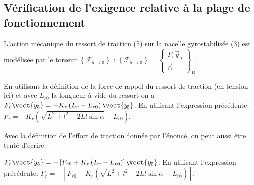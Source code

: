 \subsection*{Vérification de l'exigence relative à la plage de fonctionnement}
\ifprof
\else
L'action mécanique du ressort de traction (5) sur la nacelle gyrostabilisée (3) est modélisée par le torseur $\left\{\mathcal{F}_{5 \rightarrow 3}\right\}$ : 
$
\left\{\mathcal{F}_{5 \rightarrow 3}\right\}=\left\{\begin{array}{c}
F_{r} \vec{y}_{5} \\
\overrightarrow{0}
\end{array}\right\}_{\mathrm{B}} .
$
\fi

\ifprof
\begin{corrige}
En utilisant la définition de la force de rappel du ressort de traction (en tension ici) et  avec $L_{r0}$ la longueur à vide du ressort on a $F_r\vect{y_5}=-K_r\left(L_r-L_{r0}\right)\vect{y_5}$. En utilisant l'expression précédente:
 $\boxed{F_r=-K_r\left(\sqrt{L^2+l^2-2Ll\sin\alpha}-L_{r0}\right)}$.

Avec la définition de l'effort de traction donnée par l'énoncé, on peut aussi être tenté d'écrire 

$F_r\vect{y_5}=-\left[ F_{r0} + K_r\left(L_r-L_{r0}\right)\right]\vect{y_5}$. En utilisant l'expression précédente:
$\boxed{F_r=-\left[F_{r0} + K_r\left(\sqrt{L^2+l^2-2Ll\sin\alpha}-L_{r0}\right)\right]}$.
\end{corrige}
\else
\fi

